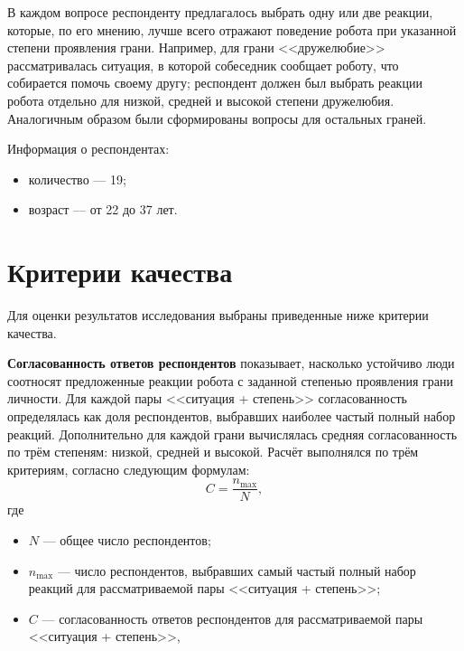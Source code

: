 В каждом вопросе респонденту предлагалось выбрать одну или две реакции, которые, по его мнению, лучше всего отражают поведение робота при указанной степени проявления грани.
Например, для грани <<дружелюбие>> рассматривалась ситуация, в которой собеседник сообщает роботу, что собирается помочь своему другу; респондент должен был выбрать реакции робота отдельно для низкой, средней и высокой степени дружелюбия.
Аналогичным образом были сформированы вопросы для остальных граней.

Информация о респондентах:

\begin{itemize}
	\item количество --- 19;
	\item возраст --- от 22 до 37 лет.
\end{itemize}

\section{Критерии качества}

Для оценки результатов исследования выбраны приведенные ниже критерии качества.


\textbf{Согласованность ответов респондентов} показывает, насколько устойчиво люди соотносят предложенные реакции робота с заданной степенью проявления грани личности.
	Для каждой пары <<ситуация + степень>> согласованность определялась как доля респондентов, выбравших наиболее частый полный набор реакций.
	Дополнительно для каждой грани вычислялась средняя согласованность по трём степеням: низкой, средней и высокой.
	Расчёт выполнялся по трём критериям, согласно следующим формулам:
	\begin{equation}
		\label{eq:research_consensus}
		C = \frac{n_{\max}}{N},
	\end{equation}
	где
	\begin{itemize}
		\item \(N\) --- общее число респондентов;
		\item \(n_{\max}\) --- число респондентов, выбравших самый частый полный набор реакций для рассматриваемой пары <<ситуация + степень>>;
		\item \(C\) --- согласованность ответов респондентов для рассматриваемой пары <<ситуация + степень>>,
	\end{itemize}

